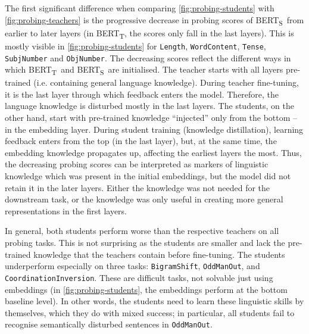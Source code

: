 \documentclass[bsc,frontabs,twoside,singlespacing,parskip,deptreport]{infthesis}
\def\BERTT{BERT\textsubscript{T}}
\def\BERTS{BERT\textsubscript{S}}
\begin{document}
{{{      %
      The first significant difference when comparing \autoref{fig:probing-students} with \autoref{fig:probing-teachers} is the progressive decrease in probing scores of \BERTS~from earlier to later layers (in \BERTT, the scores only fall in the last layers). This is mostly visible in \autoref{fig:probing-students} for \verb|Length|, \verb|WordContent|, \verb|Tense|, \verb|SubjNumber| and \verb|ObjNumber|. 
      The decreasing scores reflect the different ways in which \BERTT~and \BERTS~are initialised. The teacher starts with all layers pre-trained (i.e. containing general language knowledge). During teacher fine-tuning, it is the last layer through which feedback enters the model. Therefore, the language knowledge is disturbed mostly in the last layers.
      The students, on the other hand, start with pre-trained knowledge ``injected'' only from the bottom -- in the embedding layer. During student training (knowledge distillation), learning feedback enters from the top (in the last layer), but, at the same time, the embedding knowledge propagates up, affecting the earliest layers the most.
      Thus, the decreasing probing scores can be interpreted as markers of linguistic knowledge which was present in the initial embeddings, but the model did not retain it in the later layers. Either the knowledge was not needed for the downstream task, or the knowledge was only useful in creating more general representations in the first layers.

      In general, both students perform worse than the respective teachers on all probing tasks. This is not surprising as the students are smaller and lack the pre-trained knowledge that the teachers contain before fine-tuning. The students underperform especially on three tasks: \verb|BigramShift|, \verb|OddManOut|, and \verb|CoordinationInversion|. These are difficult tasks, not solvable just using embeddings (in \autoref{fig:probing-students}, the embeddings perform at the bottom baseline level). In other words, the students need to learn these linguistic skills by themselves, which they do with mixed success; in particular, all students fail to recognise semantically disturbed sentences in \verb|OddManOut|.

}}}
\end{document}
